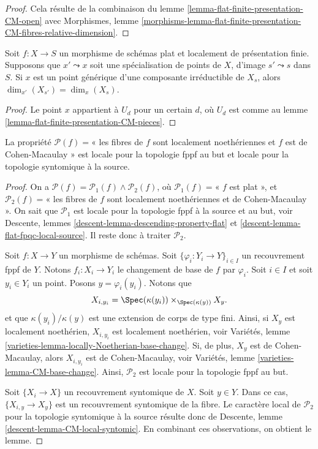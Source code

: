 \begin{proof}
Cela résulte de la combinaison du
lemme \ref{lemma-flat-finite-presentation-CM-open}
avec
Morphismes, lemme
\ref{morphisms-lemma-flat-finite-presentation-CM-fibres-relative-dimension}.
\end{proof}

\begin{lemma}
\label{lemma-flat-finite-presentation-specialization-dimension}
Soit $f : X \to S$ un morphisme de schémas plat et localement
de présentation finie.
Supposons que $x' \leadsto x$ soit une spécialisation de points de $X$,
d'image $s' \leadsto s$ dans $S$. Si $x$ est un point générique d'une
composante irréductible de $X_s$, alors $\dim_{x'}(X_{s'}) = \dim_x(X_s)$.
\end{lemma}

\begin{proof}
Le point $x$ appartient à $U_d$ pour un certain $d$, où $U_d$ est comme au
lemme \ref{lemma-flat-finite-presentation-CM-pieces}.
\end{proof}

\begin{lemma}
\label{lemma-CM-local-source-and-target}
La propriété
$\mathcal{P}(f)=$« les fibres de $f$ sont localement noethériennes et $f$ est
de Cohen-Macaulay » est locale pour la topologie fppf au but et
locale pour la topologie syntomique à la source.
\end{lemma}

\begin{proof}
On a
$\mathcal{P}(f) =
\mathcal{P}_1(f) \wedge \mathcal{P}_2(f)$,
où
$\mathcal{P}_1(f)=$« $f$ est plat », et
$\mathcal{P}_2(f)=$« les fibres de $f$ sont localement noethériennes
et de Cohen-Macaulay ».
On sait que $\mathcal{P}_1$ est
locale pour la topologie fppf à la source et au but, voir
Descente, lemmes \ref{descent-lemma-descending-property-flat} et
\ref{descent-lemma-flat-fpqc-local-source}. Il reste donc à traiter
$\mathcal{P}_2$.

\medskip\noindent
Soit $f : X \to Y$ un morphisme de schémas.
Soit $\{\varphi_i : Y_i \to Y\}_{i \in I}$ un recouvrement fppf de $Y$.
Notons $f_i : X_i \to Y_i$ le changement de base de $f$ par $\varphi_i$.
Soit $i \in I$ et soit $y_i \in Y_i$ un point.
Posons $y = \varphi_i(y_i)$. Notons que
$$
X_{i, y_i} = \Spec(\kappa(y_i)) \times_{\Spec(\kappa(y))} X_y.
$$
et que $\kappa(y_i)/\kappa(y)$ est une extension de corps
de type fini. Ainsi, si $X_y$ est localement noethérien,
$X_{i, y_i}$ est localement noethérien, voir
Variétés, lemme \ref{varieties-lemma-locally-Noetherian-base-change}.
Si, de plus, $X_y$ est de Cohen-Macaulay,
alors $X_{i, y_i}$ est de Cohen-Macaulay, voir
Variétés, lemme \ref{varieties-lemma-CM-base-change}.
Ainsi, $\mathcal{P}_2$ est locale pour la topologie fppf au but.

\medskip\noindent
Soit $\{X_i \to X\}$ un recouvrement syntomique de $X$.
Soit $y \in Y$. Dans ce cas, $\{X_{i, y} \to X_y\}$ est un
recouvrement syntomique de la fibre. Le caractère local de $\mathcal{P}_2$
pour la topologie syntomique à la source résulte donc de
Descente, lemme \ref{descent-lemma-CM-local-syntomic}.
En combinant ces observations, on obtient le lemme.
\end{proof}


